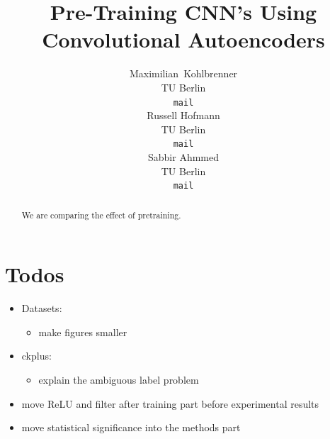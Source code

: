 \documentclass{article}
\title{Pre-Training CNN's Using Convolutional Autoencoders}
\author{
  Maximilian~Kohlbrenner\\
  TU Berlin\\
  \texttt{mail} \\
  \And
  Russell Hofmann\\
  TU Berlin\\
  \texttt{mail} \\
  \AND
  Sabbir Ahmmed \\
  TU Berlin \\
  \texttt{mail}
}
\begin{document}

\maketitle

\begin{abstract}
  We are comparing the effect of pretraining.
\end{abstract}

\section*{Todos}

\begin{itemize}
  \item Datasets:
    \begin{itemize}
      \item make figures smaller
    \end{itemize}
  \item ckplus:
    \begin{itemize}
      \item explain the ambiguous label problem 
    \end{itemize}

  \item move ReLU and filter after training part before experimental results
  \item move statistical significance into the methods part 

\end{itemize}
\end{document}
